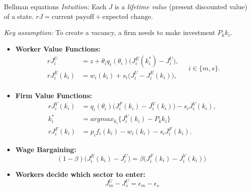 \documentclass[9pt,xcolor={svgnames}]{beamer}
\begin{document}
\begin{frame}{Bellman equations}
\textit{Intuition:} Each $J$ is a \emph{lifetime value} (present discounted value) of a state.
$rJ = \text{current payoff} + \text{expected change}.$


\textit{Key assumption:} To create a vacancy, a firm needs to make investment $P_k k_i$. 


\vspace{1em}
  \begin{itemize}
    \item \textbf{Worker Value Functions:}
      \[
      \begin{aligned}
        rJ_i^U &= z+ \theta_i q_i(\theta_i)\big(J_i^E(k^*_i)-J_i^U\big),\\
        rJ_i^E(k_i) &= w_i(k_i) + s_i\big(J_i^U-J_i^E(k_i)\big), \\
      \end{aligned}
      \quad i\in\{m,s\}.
      \]
    \item \textbf{Firm Value Functions:}
      \[
      \begin{aligned}
        rJ_i^V(k_i) &=  q_i(\theta_i)\big(J_i^F(k_i)-J_i^V(k_i)\big) - s_i J^V_i(k_i), \\
         k_i^*&= argmax_{k_i} \{ J_i^V(k_i) - P_kk_i \} \\
       rJ_i^F(k_i) &= p_i f_i(k_i) - w_i(k_i) - s_i J_i^F(k_i).
      \end{aligned}
      \]
      
    \item \textbf{Wage Bargaining:}
      \[
        (1-\beta)\bigl(J^E_i(k_i) - J^U_i\bigr)
        = \beta\bigl(J^F_i(k_i) - J^V_i(k_i)\bigr)\
      \]

    \item \textbf{Workers decide which sector to enter:}
\[
   J^U_m  - J^U_s  = \epsilon_m - \epsilon_s
\]
      
  \end{itemize}
\end{frame}
\end{document}
